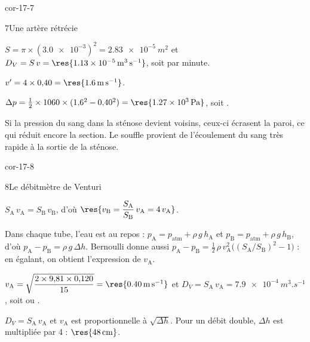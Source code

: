 \begin{blocLivre}{cor-17-7}
\begin{corrige}{7}{Une artère rétrécie}
\begin{questions}
\item $S=\pi\times(\num{3.0e-3})^2=\qty{2,83e-5}{m^2}$ et $D_V=S\,v=\res{\qty{1,13e-5}{m^3.s^{-1}}}$, soit
 par minute.
\item $v'=4\times0{,}40=\res{\qty{1,6}{m.s^{-1}}}$.
\item $\Delta p=\frac12\times1060\times(1{,}6^2-0{,}40^2)=\res{\qty{1,27e3}{Pa}}$, soit .
\item Si la pression du sang dans la sténose devient  voisins, ceux-ci écrasent la
paroi, ce qui réduit encore la section. Le souffle provient de l'écoulement  du sang très
rapide à la sortie de la sténose.
\end{questions}
\end{corrige}
\end{blocLivre}
\begin{blocLivre}{cor-17-8}
\begin{corrige}{8}{Le débitmètre de Venturi}
\begin{questions}
\item $S_\mathrm{A}\,v_\mathrm{A}=S_\mathrm{B}\,v_\mathrm{B}$, d'où $\res{v_\mathrm{B}=\dfrac{S_\mathrm{A}}{S_\mathrm{B}}\,v_\mathrm{A}=4\,v_\mathrm{A}}$.
\item Dans chaque tube, l'eau est au repos : $p_\mathrm{A}=p_\mathrm{atm}+\rho\,g\,h_\mathrm{A}$ et $p_\mathrm{B}=p_\mathrm{atm}+\rho\,g\,h_\mathrm{B}$,
d'où $p_\mathrm{A}-p_\mathrm{B}=\rho\,g\,\Delta h$. Bernoulli donne aussi
$p_\mathrm{A}-p_\mathrm{B}=\frac12\,\rho\,v_\mathrm{A}^2\big((S_\mathrm{A}/S_\mathrm{B})^2-1\big)$ : en égalant, on obtient l'expression de $v_\mathrm{A}$.
\item $v_\mathrm{A}=\sqrt{\dfrac{2\times9{,}81\times0{,}120}{15}}=\res{\qty{0,40}{m.s^{-1}}}$ et
$D_V=S_\mathrm{A}\,v_\mathrm{A}=\qty{7,9e-4}{m^3.s^{-1}}$, soit  ou .
\item $D_V=S_\mathrm{A}\,v_\mathrm{A}$ et $v_\mathrm{A}$ est proportionnelle à $\sqrt{\Delta h}$. Pour un débit double, $\Delta h$ est
multipliée par 4 : $\res{\qty{48}{cm}}$.
\end{questions}
\end{corrige}
\end{blocLivre}
